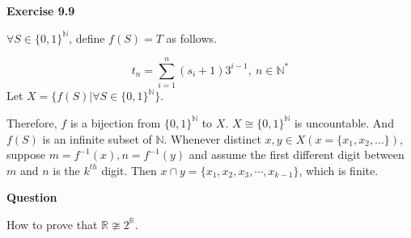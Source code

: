 \documentclass{article} %
\begin{document}
	
  \textbf{Exercise 9.9}\par
	  $\forall S\in {\{0,1\}}^{\mathbb{N}}$, define $f(S)=T$ as follows.\par
 $$t_n=\sum_{i=1}^n(s_i+1)3^{i-1},\  n\in \mathbb{N}^* $$
Let $X=\{f(S)|\forall S\in {\{0,1\}}^{\mathbb{N}}\}$. 


Therefore, $f$ is a bijection from ${\{0,1\}}^{\mathbb{N}}$ to $X$. $X\cong {\{0,1\}}^{\mathbb{N}}$ is uncountable. And $f(S)$ is an infinite subset of $\mathbb{N}$. Whenever distinct $x,y \in X(x=\{x_1,x_2,...\})$, suppose $m=f^{-1}(x),n=f^{-1}(y)$ and assume the first different digit between $m$ and $n$ is the $k^{th}$ digit. Then $x\cap y=\{x_1,x_2,x_3,\cdots,x_{k-1}\}$, which is finite.
	
		\textbf{Question}\par
	 How to prove that ${\mathbb{R}}\ncong 2^{\mathbb{R}}$.
	
\end{document}
